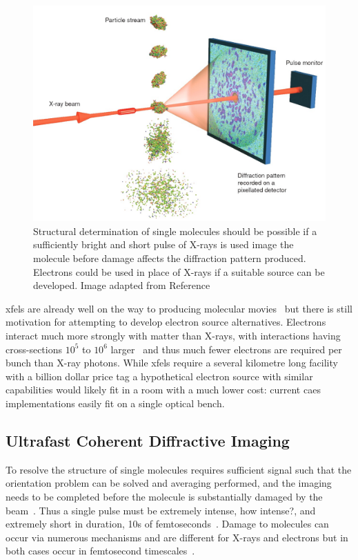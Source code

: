 \begin{figure}
    \center
    \includegraphics[width=0.65\linewidth]{0intro/Figs/single_molecule_cdi.jpg}
    \caption[Structural determination of single molecules.]{Structural determination of single molecules should be possible if a sufficiently bright and short pulse of X-rays is used image the molecule before damage affects the diffraction pattern produced. Electrons could be used in place of X-rays if a suitable source can be developed. Image adapted from Reference~\cite{gaffney_imaging_2007}}
    \label{figure:molecule_cdi}
\end{figure}

\Glspl{xfel} are already well on the way to producing molecular movies~\cite{pande_femtosecond_2016,nango_three-dimensional_2016} but there is still motivation for attempting to develop electron source alternatives.
Electrons interact much more strongly with matter than X-rays, with interactions having cross-sections $10^5$ to $10^6$ larger~\cite{sciaini_femtosecond_2011} and thus much fewer electrons are required per bunch than X-ray photons.
While \glspl{xfel} require a several kilometre long facility with a billion dollar price tag a hypothetical electron source with similar capabilities would likely fit in a room with a much lower cost: current \gls{caes} implementations easily fit on a single optical bench.

\subsection{Ultrafast Coherent Diffractive Imaging}

To resolve the structure of single molecules requires sufficient signal such that the orientation problem can be solved and averaging performed, and the imaging needs to be completed before the molecule is substantially damaged by the beam~\cite{huldt_diffraction_2003}.
Thus a single pulse must be extremely intense, {\color{red}how intense?}, and extremely short in duration, 10s of femtoseconds~\cite{chapman_femtosecond_2006}.
Damage to molecules can occur via numerous mechanisms and are different for X-rays and electrons but in both cases occur in femtosecond timescales~\cite{spence_outrunning_2017}.

